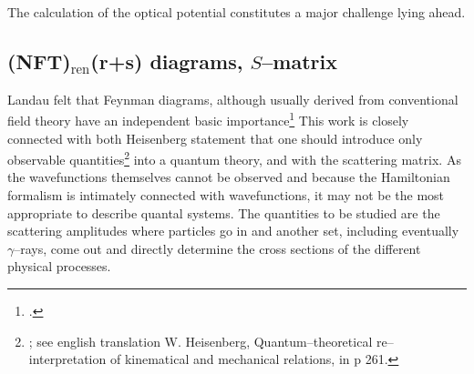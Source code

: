 The calculation of the optical potential constitutes a major challenge lying ahead.
\subsection{(NFT)$_{\text{ren}}$(r+s) diagrams, $S$--matrix}\label{S6.6.2}
Landau felt that Feynman diagrams, although usually derived from conventional field theory have an independent basic importance\footnote{\cite{Landau:59}.} This work is closely connected with both Heisenberg statement that one should introduce only observable quantities\footnote{\cite{Heisenberg:25}; see english translation W. Heisenberg, Quantum--theoretical re--interpretation of kinematical and mechanical relations, in \cite{VanderWaerden:67} p 261.} into a quantum theory, and with the scattering matrix. As the wavefunctions themselves cannot be observed and because the Hamiltonian formalism is intimately connected with wavefunctions, it may not be the most appropriate to describe quantal systems. The quantities to be studied are the scattering amplitudes where particles go in and another set, including eventually $\gamma$--rays, come out and directly determine the cross sections of the different physical processes.



